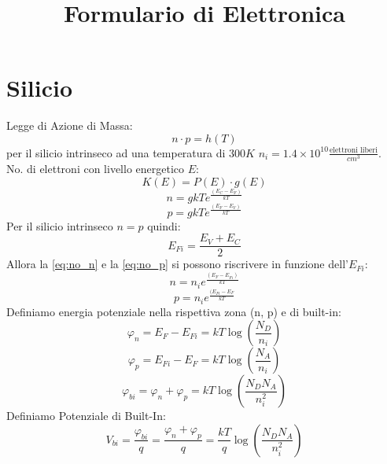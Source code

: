 \documentclass{article}
\title{Formulario di Elettronica}
\author{}
\date{}
\begin{document}
\maketitle

\section*{Silicio}
Legge di Azione di Massa:
\begin{equation*}
n \cdot p = h(T)
\end{equation*}
per il silicio intrinseco ad una temperatura di $300K$ $n_i = 1.4 \times 10^{10} \frac{\text{elettroni liberi}}{cm^3}$.\\
No. di elettroni con livello energetico $E$:
\begin{equation*}
K(E)=P(E) \cdot g(E)
\end{equation*}
\begin{equation} \label{eq:no_n}
n = gkTe^\frac{(E_C-E_F)}{kT}
\end{equation}
\begin{equation} \label{eq:no_p}
p = gkT e^\frac{(E_F-E_V)}{kT}
\end{equation}
Per il silicio intrinseco $n=p$ quindi:
\begin{equation*}
E_{Fi} = \frac{E_V + E_C}{2}
\end{equation*}
Allora la \eqref{eq:no_n} e la \eqref{eq:no_p} si possono riscrivere in funzione dell'$E_{Fi}$:
\begin{equation*}
n = n_i e^\frac{(E_F-E_{Fi})}{kT}
\end{equation*}
\begin{equation*}
p = n_i e^\frac{(E_{Fi}-E_F}{kT}
\end{equation*}
Definiamo energia potenziale nella rispettiva zona (n, p) e di built-in:
\begin{equation*}
\varphi_n = E_F-E_{Fi} = kT \log \left( \frac{N_D}{n_i} \right)
\end{equation*}
\begin{equation*}
\varphi_p = E_{Fi}-E_F = kT \log \left(\frac{N_A}{n_i}\right)
\end{equation*}
\begin{equation*}
\varphi_{bi} = \varphi_n + \varphi_p = kT \log \left(\frac{N_DN_A}{n_i^2}\right)
\end{equation*}
Definiamo Potenziale di Built-In:
\begin{equation*}
V_{bi} = \frac{\varphi_{bi}}{q} = \frac{\varphi_n + \varphi_p}{q} = \frac{kT}{q} \log \left(\frac{N_DN_A}{n_i^2}\right)
\end{equation*}
\end{document}
